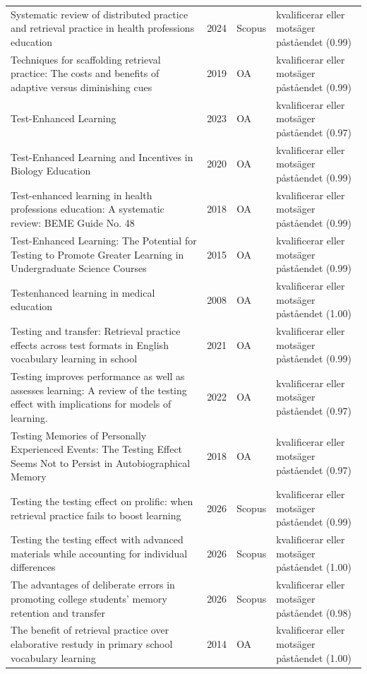 \begin{longtable}{@{}%
  >{\raggedright\arraybackslash}p{}c%
  >{\raggedright\arraybackslash}p{}%
  >{\raggedright\arraybackslash}p{}@{}}
Systematic review of distributed practice and retrieval practice in health professions education & 2024 & Scopus & kvalificerar eller motsäger påståendet (0.99) \\
Techniques for scaffolding retrieval practice: The costs and benefits of adaptive versus diminishing cues & 2019 & OA & kvalificerar eller motsäger påståendet (0.99) \\
Test-Enhanced Learning & 2023 & OA & kvalificerar eller motsäger påståendet (0.97) \\
Test-Enhanced Learning and Incentives in Biology Education & 2020 & OA & kvalificerar eller motsäger påståendet (0.99) \\
Test-enhanced learning in health professions education: A systematic review: BEME Guide No. 48 & 2018 & OA & kvalificerar eller motsäger påståendet (0.99) \\
Test-Enhanced Learning: The Potential for Testing to Promote Greater Learning in Undergraduate Science Courses & 2015 & OA & kvalificerar eller motsäger påståendet (0.99) \\
Testenhanced learning in medical education & 2008 & OA & kvalificerar eller motsäger påståendet (1.00) \\
Testing and transfer: Retrieval practice effects across test formats in English vocabulary learning in school & 2021 & OA & kvalificerar eller motsäger påståendet (0.99) \\
Testing improves performance as well as assesses learning: A review of the testing effect with implications for models of learning. & 2022 & OA & kvalificerar eller motsäger påståendet (0.97) \\
Testing Memories of Personally Experienced Events: The Testing Effect Seems Not to Persist in Autobiographical Memory & 2018 & OA & kvalificerar eller motsäger påståendet (0.97) \\
Testing the testing effect on prolific: when retrieval practice fails to boost learning & 2026 & Scopus & kvalificerar eller motsäger påståendet (0.99) \\
Testing the testing effect with advanced materials while accounting for individual differences & 2026 & Scopus & kvalificerar eller motsäger påståendet (1.00) \\
The advantages of deliberate errors in promoting college students' memory retention and transfer & 2026 & Scopus & kvalificerar eller motsäger påståendet (0.98) \\
The benefit of retrieval practice over elaborative restudy in primary school vocabulary learning & 2014 & OA & kvalificerar eller motsäger påståendet (1.00) \\

\end{longtable}
